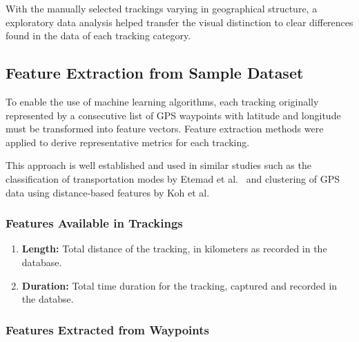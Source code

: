 \documentclass[a4paper,12pt,twoside]{scrreprt}
\begin{document}
With the manually selected trackings varying in geographical structure, a
exploratory data
analysis helped transfer the visual distinction to clear differences found in
the data of each tracking category.

\subsection{Feature Extraction from Sample Dataset}
To enable the use of machine learning algorithms, each tracking originally
represented by a consecutive list of GPS waypoints with latitude and longitude
must be transformed into feature vectors. Feature extraction methods were
applied to derive representative metrics for each tracking.

This approach is well established and used in similar studies such as the
classification
of transportation modes by Etemad et al.~\cite{etemad_predicting_2018} and
clustering of GPS data using distance-based features by Koh et
al.~\cite{koh_clustering_2022}

\subsubsection{Features Available in Trackings}

\begin{enumerate}
  \item \textbf{Length:} Total distance of the tracking, in kilometers as
        recorded in the database.
  \item \textbf{Duration:} Total time duration for the tracking, captured and
        recorded in the databse.
\end{enumerate}

\subsubsection{Features Extracted from Waypoints}
\end{document}
